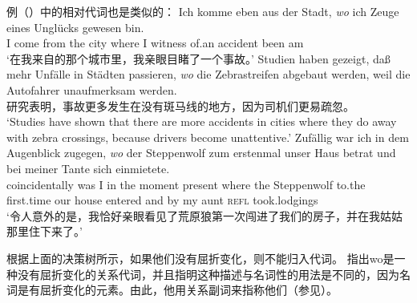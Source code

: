 例（）中的相对代词也是类似的：
\eal
\ex 
\gll Ich komme eben aus der Stadt, \emph{wo} ich Zeuge eines Unglücks gewesen bin.\footnotemark\\
	 I come \particle{} from the city where I witness of.an accident been am\\
\label{bsp-wo-ich-zeuge}
\glt `在我来自的那个城市里，我亲眼目睹了一个事故。' 
\ex 
\gll Studien haben gezeigt, daß mehr Unfälle in Städten passieren, \emph{wo} die Zebrastreifen abgebaut werden, weil die Autofahrer unaufmerksam werden.\footnotemark\\
     研究表明，事故更多发生在没有斑马线的地方，因为司机们更易疏忽。\\
\glt `Studies have shown that there are more accidents in cities where they do away with zebra crossings, because drivers become unattentive.'
\ex 
\gll Zufällig war ich in dem Augenblick zugegen, \emph{wo} der Steppenwolf zum erstenmal unser Haus betrat und bei meiner Tante sich einmietete.\footnotemark\\
	 coincidentally was I in the moment present where the Steppenwolf to.the first.time our house entered and by my aunt \textsc{refl} took.lodgings\\

\glt `令人意外的是，我恰好亲眼看见了荒原狼第一次闯进了我们的房子，并在我姑姑那里住下来了。'
\zl

根据上面的决策树所示，如果他们没有屈折变化，则不能归入代词。\citet[]{Eisenberg2004a} 指出wo是一种没有屈折变化的关系代词，并且指明这种描述与名词性的用法是不同的，因为名词是有屈折变化的元素。由此，他用关系副词来指称他们（参见）。

